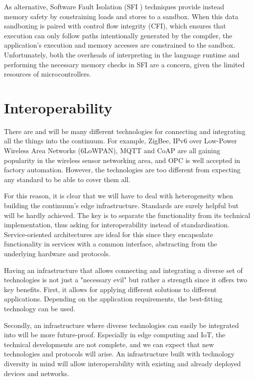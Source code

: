 As alternative, Software Fault Isolation (SFI \cite{sfi}) techniques provide instead memory safety by constraining loads and stores to a sandbox. When this data sandboxing is paired with control flow integrity (CFI), which ensures that execution can only follow paths intentionally generated by the compiler, the application's execution and memory accesses are constrained to the sandbox. Unfortunately, both the overheads of interpreting in the language runtime and performing the necessary memory checks in SFI are a concern, given the limited resources of microcontrollers.

\section{Interoperability}
\label{sec:interoperability}

There are and will be many different technologies for connecting and integrating all the things into the continuum. For example, ZigBee, IPv6 over Low-Power Wireless Area Networks (6LoWPAN), MQTT and CoAP \cite{mqtt-coap-amqp-http} are all gaining popularity in the wireless sensor networking area, and OPC \cite{rest-opc} is well accepted in factory automation. However, the technologies are too different from expecting any standard to be able to cover them all.

For this reason, it is clear that we will have to deal with heterogeneity when building the continuum's edge infrastructure. Standards are surely helpful but will be hardly achieved. The key is to separate the functionality from its technical implementation, thus asking for interoperability instead of standardisation. Service-oriented architectures are ideal for this since they encapsulate functionality in services with a common interface, abstracting from the underlying hardware and protocols.

Having an infrastructure that allows connecting and integrating a diverse set of technologies is not just a "necessary evil" but rather a strength since it offers two key benefits. First, it allows for applying different solutions to different applications. Depending on the application requirements, the best-fitting technology can be used.

Secondly, an infrastructure where diverse technologies can easily be integrated into will be more future-proof. Especially in edge computing and IoT, the technical developments are not complete, and we can expect that new technologies and protocols will arise. An infrastructure built with technology diversity in mind will allow interoperability with existing and already deployed devices and networks.


